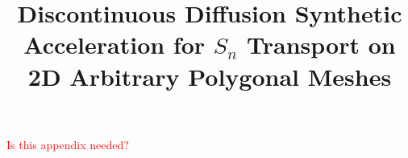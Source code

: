 \documentclass{article}
\renewcommand{\(}{\left(}
\renewcommand{\)}{\right)}
\renewcommand{\[}{\left[}
\renewcommand{\]}{\right]}
\newcommand{\sn}{\ensuremath{S_n}\xspace}
\begin{document}
\title{Discontinuous Diffusion Synthetic Acceleration for \sn Transport on
2D Arbitrary Polygonal Meshes}
\author{} 
\date{}
\maketitle








\textcolor{red}{Is this appendix needed?}




\end{document}
